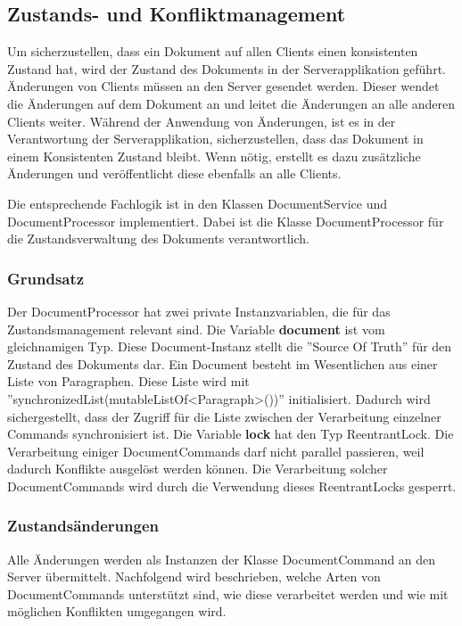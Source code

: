 \clearpage

\subsection{Zustands- und Konfliktmanagement}\label{subsec:statemgmt}

Um sicherzustellen, dass ein Dokument auf allen Clients einen konsistenten Zustand hat, wird der Zustand des Dokuments in der Serverapplikation geführt.
Änderungen von Clients müssen an den Server gesendet werden.
Dieser wendet die Änderungen auf dem Dokument an und leitet die Änderungen an alle anderen Clients weiter.
Während der Anwendung von Änderungen, ist es in der Verantwortung der Serverapplikation, sicherzustellen, dass das Dokument in einem Konsistenten Zustand bleibt.
Wenn nötig, erstellt es dazu zusätzliche Änderungen und veröffentlicht diese ebenfalls an alle Clients.

Die entsprechende Fachlogik ist in den Klassen DocumentService und DocumentProcessor implementiert.
Dabei ist die Klasse DocumentProcessor für die Zustandsverwaltung des Dokuments verantwortlich.


\subsubsection{Grundsatz}

Der DocumentProcessor hat zwei private Instanzvariablen, die für das Zustandsmanagement relevant sind.
Die Variable \textbf{document} ist vom gleichnamigen Typ.
Diese Document-Instanz stellt die ''Source Of Truth'' für den Zustand des Dokuments dar.
Ein Document besteht im Wesentlichen aus einer Liste von Paragraphen.
Diese Liste wird mit ''synchronizedList(mutableListOf<Paragraph>())'' initialisiert.
Dadurch wird sichergestellt, dass der Zugriff für die Liste zwischen der Verarbeitung einzelner Commands synchronisiert ist.
Die Variable \textbf{lock} hat den Typ ReentrantLock.
Die Verarbeitung einiger DocumentCommands darf nicht parallel passieren, weil dadurch Konflikte ausgelöst werden können.
Die Verarbeitung solcher DocumentCommands wird durch die Verwendung dieses ReentrantLocks gesperrt.

\subsubsection{Zustandsänderungen}

Alle Änderungen werden als Instanzen der Klasse DocumentCommand an den Server übermittelt.
Nachfolgend wird beschrieben, welche Arten von DocumentCommands unterstützt sind, wie diese verarbeitet werden und wie mit möglichen Konflikten umgegangen wird.


